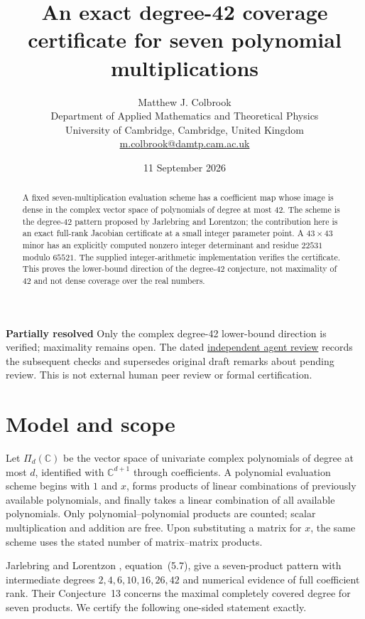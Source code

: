 \documentclass[11pt]{article}
\title{An exact degree-42 coverage certificate for seven polynomial multiplications}
\author{Matthew J. Colbrook\\\small Department of Applied Mathematics and Theoretical Physics\\\small University of Cambridge, Cambridge, United Kingdom\\\small\href{mailto:m.colbrook@damtp.cam.ac.uk}{m.colbrook@damtp.cam.ac.uk}}
\date{11 September 2026}
\newcommand{\C}{\mathbb C}
\begin{document}
\maketitle

\noindent\textbf{Partially resolved} Only the complex degree-42 lower-bound direction is verified; maximality remains open.
The dated \href{https://github.com/MColbrook/OpenProblemsInNLA/blob/codex/colbrook-matrix-function-resolutions/references/colbrook-matrix-functions-2026-09-11/verification/reviews/MF-14-review.md}{independent agent review} records the subsequent checks and supersedes original draft remarks about pending review. This is not external human peer review or formal certification.
\par\medskip

\begin{abstract}
A fixed seven-multiplication evaluation scheme has a coefficient map whose image is dense in the complex vector space of polynomials of degree at most 42. The scheme is the degree-42 pattern proposed by Jarlebring and Lorentzon; the contribution here is an exact full-rank Jacobian certificate at a small integer parameter point. A $43\times43$ minor has an explicitly computed nonzero integer determinant and residue $22531$ modulo $65521$. The supplied integer-arithmetic implementation verifies the certificate. This proves the lower-bound direction of the degree-42 conjecture, not maximality of 42 and not dense coverage over the real numbers.
\end{abstract}

\section{Model and scope}
Let $\Pi_d(\C)$ be the vector space of univariate complex polynomials of degree at most $d$, identified with $\C^{d+1}$ through coefficients. A polynomial evaluation scheme begins with $1$ and $x$, forms products of linear combinations of previously available polynomials, and finally takes a linear combination of all available polynomials. Only polynomial--polynomial products are counted; scalar multiplication and addition are free. Upon substituting a matrix for $x$, the same scheme uses the stated number of matrix--matrix products.

Jarlebring and Lorentzon \cite{JL}, equation~(5.7), give a seven-product pattern with intermediate degrees $2,4,6,10,16,26,42$ and numerical evidence of full coefficient rank. Their Conjecture~13 concerns the maximal completely covered degree for seven products. We certify the following one-sided statement exactly.
\end{document}
